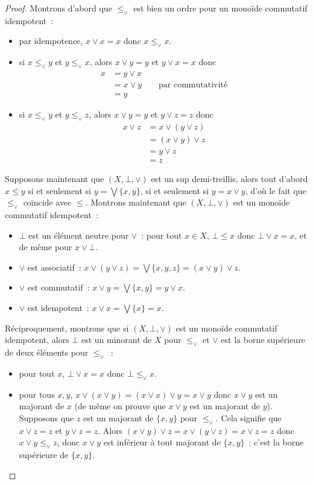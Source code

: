 \begin{proof}
  Montrons d'abord que $\leq_\lor$ est bien un ordre pour un monoïde commutatif
  idempotent~:
  \begin{itemize}
  \item par idempotence, $x\lor x = x$ donc $x\leq_\lor x$.
  \item si $x\leq_\lor y$ et $y\leq_\lor x$, alors $x\lor y = y$ et
    $y \lor x = x$
    donc
    \begin{align*}
      x &= y \lor x \\
      &= x \lor y \qquad\text{par commutativité}\\
      &= y
    \end{align*}
  \item si $x\leq_\lor y$ et $y\leq_\lor z$, alors $x\lor y = y$ et
    $y \lor z = z$
    donc
    \begin{align*}
      x\lor z &= x \lor (y \lor z) \\
      &= (x \lor y) \lor z \\
      &= y \lor z \\
      &= z
    \end{align*}
  \end{itemize}

  Supposons maintenant que $(X,\bot,\lor)$ est un sup demi-treillis, alors tout
  d'abord $x\leq y$ si et seulement si $y = \bigvee\{x,y\}$, si et seulement si
  $y = x \lor y$, d'où le fait que $\leq_\lor$ coïncide avec $\leq$. Montrons
  maintenant que $(X,\bot,\lor)$ est un monoïde commutatif idempotent~:
  \begin{itemize}
  \item $\bot$ est un élément neutre pour $\lor$~: pour tout $x\in X$,
    $\bot\leq x$ donc $\bot \vee x = x$, et de même pour $x\vee\bot$.
  \item $\lor$ est associatif~:
    $x\lor (y \lor z) = \bigvee\{x,y,z\} = (x\lor y)\lor z$.
  \item $\lor$ est commutatif~: $x\lor y = \bigvee\{x,y\}=y\lor x$.
  \item $\lor$ est idempotent~: $x\lor x = \bigvee\{x\}=x$.
  \end{itemize}

  Réciproquement, montrons que si $(X,\bot,\lor)$ est un monoïde commutatif
  idempotent, alors $\bot$ est un minorant de $X$ pour $\leq_\lor$ et $\lor$ est
  la borne supérieure de deux éléments pour $\leq_\lor$~:
  \begin{itemize}
  \item pour tout $x$, $\bot \lor x = x$ donc $\bot \leq_\lor x$.
  \item pour tous $x,y$, $x\lor (x\lor y) = (x\lor x)\lor y = x\lor y$ donc
    $x\lor y$ est un majorant de $x$ (de même on prouve que $x\lor y$ est un
    majorant de $y$). Supposons que $z$ est un majorant de $\{x,y\}$ pour
    $\leq_\lor$. Cela signifie que $x\lor z = z$ et $y\lor z = z$. Alors
    $(x\lor y)\lor z = x\lor (y\lor z) = x\lor z = z$ donc
    $x\lor y \leq_\lor z$, donc $x\lor y$ est inférieur à tout majorant de
    $\{x,y\}$~: c'est la borne supérieure de $\{x,y\}$.
  \end{itemize}
\end{proof}

